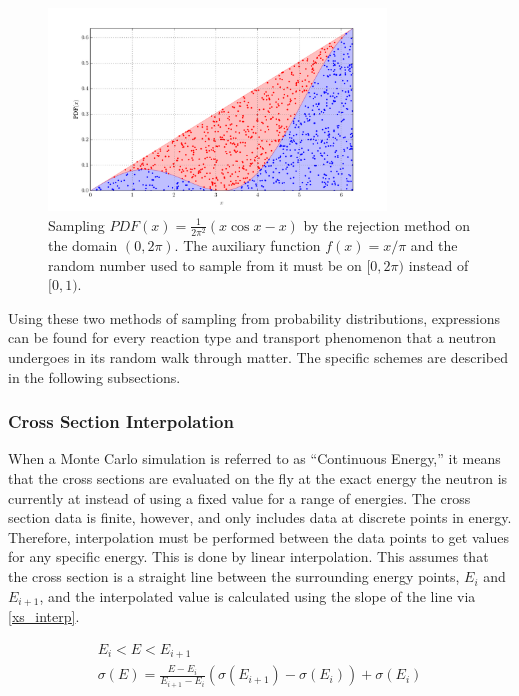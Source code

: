 \begin{figure}[h!] 
  \centering
    \includegraphics[width=0.8\textwidth]{graphics/rejection_samp.pdf}
     \caption{Sampling $PDF(x)=\frac{1}{2\pi^2}(x \cos x - x)$ by the rejection method on the domain $(0,2\pi)$.  The auxiliary function $f(x)=x/\pi$ and the random number used to sample from it must be on $[0,2\pi)$ instead of $[0,1)$. \label{rejection_samp}}
\end{figure}

Using these two methods of sampling from probability distributions, expressions can be found for every reaction type and transport phenomenon that a neutron undergoes in its random walk through matter.  The specific schemes are described in the following subsections.

\subsubsection{Cross Section Interpolation}

When a Monte Carlo simulation is referred to as ``Continuous Energy,'' it means that the cross sections are evaluated on the fly at the exact energy the neutron is currently at instead of using a fixed value for a range of energies.  The cross section data is finite, however, and only includes data at discrete points in energy.  Therefore, interpolation must be performed between the data points to get values for any specific energy.  This is done by linear interpolation.  This assumes that the cross section is a straight line between the surrounding energy points, $E_i$ and $E_{i+1}$, and the interpolated value is calculated using the slope of the line via \eqref{xs_interp}.

 \begin{equation}
\label{xs_interp}
\begin{gathered}
E_i < E < E_{i+1} \\
\sigma(E) = \frac{E-E_i}{E_{i+1}-E_i}(\sigma(E_{i+1})-\sigma(E_i)) + \sigma(E_i)
\end{gathered}
\end{equation}



